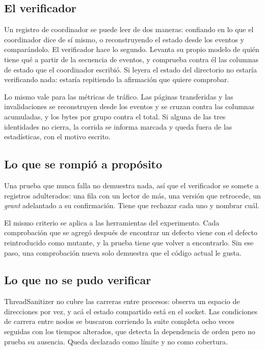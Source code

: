 \subsection{El verificador}

Un registro de coordinador se puede leer de dos maneras: confiando en lo que
el coordinador dice de sí mismo, o reconstruyendo el estado desde los eventos
y comparándolo. El verificador hace lo segundo. Levanta su propio modelo de
quién tiene qué a partir de la secuencia de eventos, y comprueba contra él las
columnas de estado que el coordinador escribió. Si leyera el estado del
directorio no estaría verificando nada: estaría repitiendo la afirmación que
quiere comprobar.

Lo mismo vale para las métricas de tráfico. Las páginas transferidas y las
invalidaciones se reconstruyen desde los eventos y se cruzan contra las
columnas acumuladas, y los bytes por grupo contra el total. Si alguna de las
tres identidades no cierra, la corrida se informa marcada y queda fuera de las
estadísticas, con el motivo escrito.

\subsection{Lo que se rompió a propósito}

Una prueba que nunca falla no demuestra nada, así que el verificador se somete
a registros adulterados: una fila con un lector de más, una versión que
retrocede, un \emph{grant} adelantado a su confirmación. Tiene que rechazar
cada uno y nombrar cuál.

El mismo criterio se aplica a las herramientas del experimento. Cada
comprobación que se agregó después de encontrar un defecto viene con el
defecto reintroducido como mutante, y la prueba tiene que volver a
encontrarlo. Sin ese paso, una comprobación nueva solo demuestra que el código
actual le gusta.

\subsection{Lo que no se pudo verificar}

ThreadSanitizer no cubre las carreras entre procesos: observa un espacio de
direcciones por vez, y acá el estado compartido está en el socket. Las
condiciones de carrera entre nodos se buscaron corriendo la suite completa
ocho veces seguidas con los tiempos alterados, que detecta la dependencia de
orden pero no prueba su ausencia. Queda declarado como límite y no como
cobertura.
